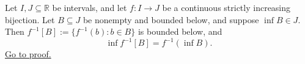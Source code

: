 \begin{theorem}
\label{thm:increasing-inverse-preserves-infima}
Let $I,J\subseteq\mathbb{R}$ be intervals, and let $f\colon I\to J$ be a continuous
strictly increasing bijection.  Let $B\subseteq J$ be nonempty and bounded
below, and suppose $\inf B\in J$.  Then
$f^{-1}[B]:=\{f^{-1}(b):b\in B\}$ is bounded below, and
\[
  \inf f^{-1}[B]=f^{-1}(\inf B).
\]
\hyperref[prf:increasing-inverse-preserves-infima]{Go to proof.}
\end{theorem}